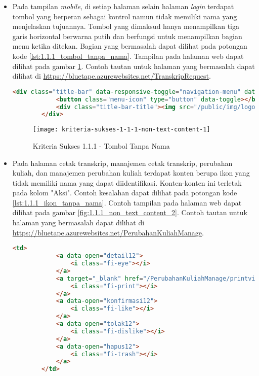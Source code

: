 \begin{itemize}
    \item Pada tampilan \textit{mobile}, di setiap halaman selain halaman \textit{login} terdapat tombol yang berperan sebagai kontrol namun tidak memiliki nama yang menjelaskan tujuannya. Tombol yang dimaksud hanya menampilkan tiga garis horizontal berwarna putih dan berfungsi untuk menampilkan bagian menu ketika ditekan. Bagian yang bermasalah dapat dilihat pada potongan kode \ref{lst:1.1.1_tombol_tanpa_nama}. Tampilan pada halaman web dapat dilihat pada gambar \ref{fig:1.1.1_non_text_content_1}. Contoh tautan untuk halaman yang bermasalah dapat dilihat di \url{https://bluetape.azurewebsites.net/TranskripRequest}.
    \begin{lstlisting}[frame=single, label={lst:1.1.1_tombol_tanpa_nama}, language=HTML, caption=Kriteria Sukses 1.1.1 - Tombol Tanpa Nama]
        <div class="title-bar" data-responsive-toggle="navigation-menu" data-hide-for="medium">
            <button class="menu-icon" type="button" data-toggle></button>
            <div class="title-bar-title"><img src="/public/img/logo.png" class="textsized" alt="B"/></div>
        </div>
    \end{lstlisting}
    
    \begin{figure}[H]
        \centering  
        \texttt{[image: kriteria-sukses-1-1-1-non-text-content-1]}  
        \caption[Kriteria Sukses 1.1.1 - Tombol Tanpa Nama]{Kriteria Sukses 1.1.1 - Tombol Tanpa Nama}
        \label{fig:1.1.1_non_text_content_1}  
    \end{figure}

    \item Pada halaman cetak transkrip, manajemen cetak transkrip, perubahan kuliah, dan manajemen perubahan kuliah terdapat konten berupa ikon yang tidak memiliki nama yang dapat diidentifikasi. Konten-konten ini terletak pada kolom "Aksi". Contoh kesalahan dapat dilihat pada potongan kode \ref{lst:1.1.1_ikon_tanpa_nama}. Contoh tampilan pada halaman web dapat dilihat pada gambar \ref{fig:1.1.1_non_text_content_2}. Contoh tautan untuk halaman yang bermasalah dapat dilihat di \url{https://bluetape.azurewebsites.net/PerubahanKuliahManage}.
    \begin{lstlisting}[frame=single, label={lst:1.1.1_ikon_tanpa_nama}, language=HTML, caption=Kriteria Sukses 1.1.1 - Ikon Tanpa Nama]
        <td>
            <a data-open="detail12">
                <i class="fi-eye"></i>
            </a>
            <a target="_blank" href="/PerubahanKuliahManage/printview/12">
                <i class="fi-print"></i>
            </a>
            <a data-open="konfirmasi12">
                <i class="fi-like"></i>
            </a>  
            <a data-open="tolak12">
                <i class="fi-dislike"></i>
            </a>
            <a data-open="hapus12">
                <i class="fi-trash"></i>
            </a>
        </td>
    \end{lstlisting}
    

\end{itemize}
